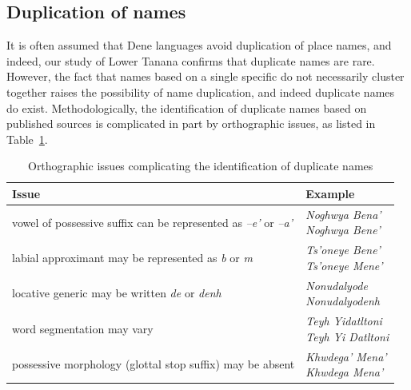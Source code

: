 \subsection{Duplication of names}
It is often assumed that Dene languages avoid duplication of place names, and indeed, our study of Lower Tanana confirms that duplicate names are rare. However, the fact that names based on a single specific do not necessarily cluster together raises the possibility of name duplication, and indeed duplicate names do exist. Methodologically, the identification of duplicate names based on published sources is complicated in part by orthographic issues, as listed in Table~\ref{holton:tab:orthographic}.

\begin{table}[h]
	\centering%
\caption{Orthographic issues complicating the identification of duplicate names}\label{holton:tab:orthographic}
\begin{tabular}{l | l }
\textbf{Issue} & \textbf{Example} \\
\hline
vowel of possessive suffix can be represented as \textit{–e’} or \textit{–a’} & \makecell{\textit{Noghwya Bena’} \\ \textit{Noghwya Bene’} \vspace{5pt} }\\ 
labial approximant may be represented as \textit{b}  or \textit{m} & \makecell{ \textit{Ts’oneye Bene’} \\ \textit{Ts’oneye Mene’}  \vspace{5pt}  } \\
locative generic may be written \textit{de} or \textit{denh} & \makecell{ \textit{Nonudalyode} \\ \textit{Nonudalyodenh}\vspace{5pt} }\\
word segmentation may vary & \makecell{ \textit{Teyh Yidatltoni} \\ \textit{Teyh Yi Datltoni} \vspace{5pt} } \\
possessive morphology (glottal stop suffix) may be absent & \makecell{ \vspace{5pt}\textit{Khwdega’ Mena’} \\ \textit{Khwdega Mena’} \vspace{5pt}} \\

\end{tabular}
\end{table}

